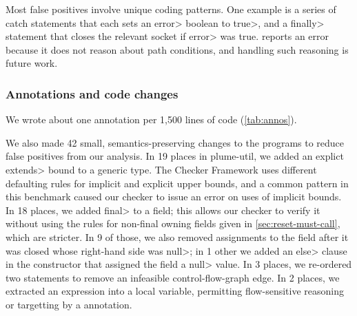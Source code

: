Most false positives involve unique coding patterns.
One example is a series of catch
statements that each sets an \<error> boolean to \<true>, and
a \<finally> statement that closes the relevant socket if \<error>
was true.  \Tool reports an error because it does not reason about path
conditions, and handling such reasoning is future work.

\subsubsection{Annotations and code changes}
\label{sec:annos}


We wrote about one annotation per 1,500 lines of code (\cref{tab:annos}).

We also
made 42 small, semantics-preserving changes to the programs to reduce
false positives from our analysis.
%
In 19 places in plume-util, we added an explict \<extends> bound to a generic type.
The Checker Framework uses different defaulting rules for implicit and explicit
upper bounds, and a common pattern in this benchmark caused our checker to issue
an error on uses of implicit bounds.
%
In 18 places, we added \<final> to a field; this allows our checker to verify it without using
the rules for non-final owning fields given in \cref{sec:reset-must-call}, which are stricter.
In 9 of those, we also removed assignments to the field after it was closed whose right-hand
side was \<null>; in 1 other we added an \<else> clause in the constructor that assigned the field
a \<null> value.
%
In 3 places, we re-ordered two statements to remove an
infeasible control-flow-graph edge.
%
In 2 places, we extracted an expression into a local variable, permitting
flow-sensitive reasoning or targetting by a \CreatesObligation annotation.

